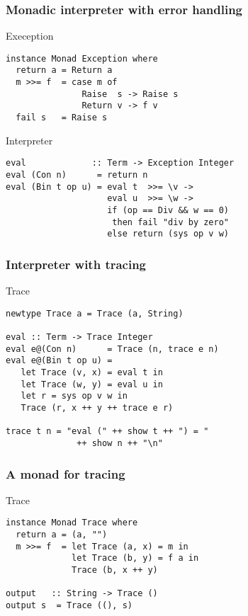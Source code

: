\documentclass{beamer}
\begin{document}
\begin{frame}[fragile]
  \frametitle{Monadic interpreter with error handling}
  \begin{alertblock}{Exeception}
\begin{verbatim}
instance Monad Exception where
  return a = Return a
  m >>= f  = case m of 
               Raise  s -> Raise s
               Return v -> f v
  fail s   = Raise s
\end{verbatim}  
\end{alertblock}

\begin{exampleblock}{Interpreter}
\begin{verbatim}
eval             :: Term -> Exception Integer
eval (Con n)      = return n
eval (Bin t op u) = eval t  >>= \v ->
                    eval u  >>= \w ->
                    if (op == Div && w == 0) 
                     then fail "div by zero"
                    else return (sys op v w)
\end{verbatim}  
\end{exampleblock}
\end{frame}             

\begin{frame}[fragile]
  \frametitle{Interpreter with tracing}
  \begin{block}{Trace}
\begin{verbatim}
newtype Trace a = Trace (a, String)

eval :: Term -> Trace Integer
eval e@(Con n)      = Trace (n, trace e n)
eval e@(Bin t op u) = 
   let Trace (v, x) = eval t in
   let Trace (w, y) = eval u in
   let r = sys op v w in
   Trace (r, x ++ y ++ trace e r)

trace t n = "eval (" ++ show t ++ ") = "
              ++ show n ++ "\n"
\end{verbatim}  
\end{block}
\end{frame}


\begin{frame}[fragile]
  \frametitle{A monad for tracing}
  \begin{alertblock}{Trace}
\begin{verbatim}
instance Monad Trace where
  return a = (a, "")
  m >>= f  = let Trace (a, x) = m in
             let Trace (b, y) = f a in
             Trace (b, x ++ y)

output   :: String -> Trace ()
output s  = Trace ((), s)
\end{verbatim}  
\end{alertblock}
\end{frame}
\end{document}
